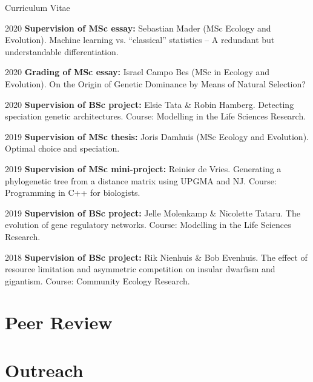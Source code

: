 \documentclass[11pt,a4paper]{article}
\begin{document}
\begin{cv}{Curriculum Vitae}
\begin{cvlist}{}
			\item[2020] \textbf{Supervision of MSc essay:} Sebastian Mader (MSc Ecology and Evolution).
			Machine learning vs. “classical” statistics – A redundant but understandable differentiation.
			
			\item[2020] \textbf{Grading of MSc essay:} Israel Campo Bes (MSc in Ecology and Evolution).
			On the Origin of Genetic Dominance by Means of Natural Selection?
			
			\item[2020] \textbf{Supervision of BSc project:} Elsie Tata \& Robin Hamberg.
			Detecting speciation genetic architectures. Course: Modelling in the Life Sciences Research.
			
			\item[2019] \textbf{Supervision of MSc thesis:} Joris Damhuis (MSc Ecology and Evolution).
			Optimal choice and speciation.
			
			\item[2019] \textbf{Supervision of MSc mini-project:} Reinier de Vries.
			Generating a phylogenetic tree from a distance matrix using UPGMA and NJ. Course: Programming in C++ for biologists.
	
			\item[2019] \textbf{Supervision of BSc project:} Jelle Molenkamp \& Nicolette Tataru. The evolution of gene regulatory networks. Course: Modelling in the Life Sciences Research.
			
			\item[2018] \textbf{Supervision of BSc project:} Rik Nienhuis \& Bob Evenhuis. The effect of resource limitation and asymmetric competition on insular dwarfism and gigantism. Course: Community Ecology Research.

        \end{cvlist}
		
		\section{Peer Review}

		
		\section{Outreach}
		

\end{cv}
\end{document}

